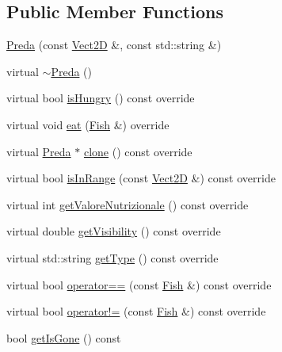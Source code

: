 \subsection*{Public Member Functions}
\begin{DoxyCompactItemize}
\item 
\hyperlink{classPreda_aeddef5ec6e57cc15875046523d8ed119_aeddef5ec6e57cc15875046523d8ed119}{Preda} (const \hyperlink{classVect2D}{Vect2D} \&, const std\+::string \&)
\item 
virtual \hyperlink{classPreda_ab33b836828f2273af29692406d985a8b_ab33b836828f2273af29692406d985a8b}{$\sim$\+Preda} ()
\item 
virtual bool \hyperlink{classPreda_ae63bc07a928fe4b6685fcdd06c22a506_ae63bc07a928fe4b6685fcdd06c22a506}{is\+Hungry} () const override
\item 
virtual void \hyperlink{classPreda_ac7d83956cf08c9300d331a5505ab3118_ac7d83956cf08c9300d331a5505ab3118}{eat} (\hyperlink{classFish}{Fish} \&) override
\item 
virtual \hyperlink{classPreda}{Preda} $\ast$ \hyperlink{classPreda_a12baf94e52873bf3b9a9a9da84c357c5_a12baf94e52873bf3b9a9a9da84c357c5}{clone} () const override
\item 
virtual bool \hyperlink{classPreda_a4014c320e53abbfc7cbfb30f18791db2_a4014c320e53abbfc7cbfb30f18791db2}{is\+In\+Range} (const \hyperlink{classVect2D}{Vect2D} \&) const override
\item 
virtual int \hyperlink{classPreda_a9f0e2e1f347466a5084f887dab6c218f_a9f0e2e1f347466a5084f887dab6c218f}{get\+Valore\+Nutrizionale} () const override
\item 
virtual double \hyperlink{classPreda_a0541a146d9779d0391c0cff244964dd4_a0541a146d9779d0391c0cff244964dd4}{get\+Visibility} () const override
\item 
virtual std\+::string \hyperlink{classPreda_a0acc2147813c125f3fdd7b0743d62b81_a0acc2147813c125f3fdd7b0743d62b81}{get\+Type} () const override
\item 
virtual bool \hyperlink{classPreda_a38ba49e7ab329e8ebbf23f242d3dd084_a38ba49e7ab329e8ebbf23f242d3dd084}{operator==} (const \hyperlink{classFish}{Fish} \&) const override
\item 
virtual bool \hyperlink{classPreda_a69a59a55918bddb47457275763b2b352_a69a59a55918bddb47457275763b2b352}{operator!=} (const \hyperlink{classFish}{Fish} \&) const override
\item 
bool \hyperlink{classFish_a64e050916c0094ac377b8ec0d86a000b_a64e050916c0094ac377b8ec0d86a000b}{get\+Is\+Gone} () const

\end{DoxyCompactItemize}

